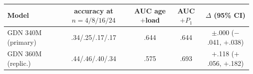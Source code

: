 \begin{tabular}{lcccc}
\toprule
Model & accuracy at $n=4/8/16/24$ & AUC age$+$load & AUC $+P_1$ & $\Delta$ (95\% CI) \\
\midrule
GDN 340M (primary) & .34/.25/.17/.17 & .644 & .644 & $\pm$.000 ($-$.041, $+$.038) \\
GDN 360M (replic.) & .44/.46/.40/.34 & .575 & .693 & $+$.118 ($+$.056, $+$.182) \\
\bottomrule
\end{tabular}
